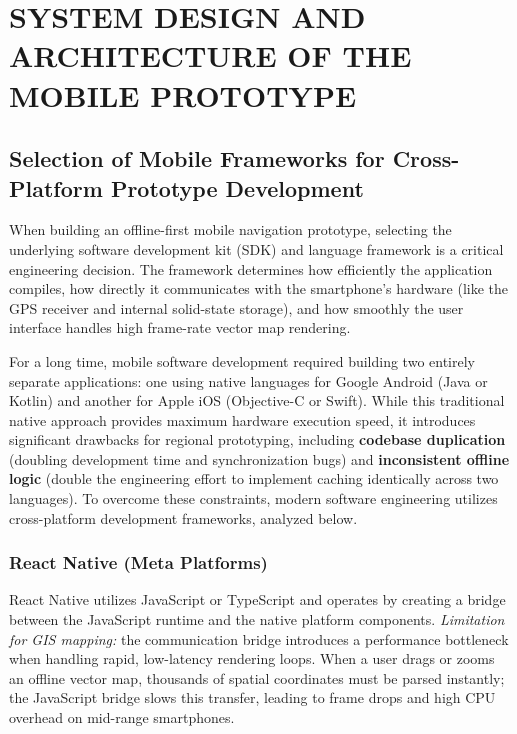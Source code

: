 \documentclass[12pt,a4paper,oneside]{report}
\begin{document}
\chapter{SYSTEM DESIGN AND ARCHITECTURE OF THE MOBILE PROTOTYPE}

\section{Selection of Mobile Frameworks for Cross-Platform Prototype Development}

When building an offline-first mobile navigation prototype, selecting the underlying
software development kit (SDK) and language framework is a critical engineering decision.
The framework determines how efficiently the application compiles, how directly it
communicates with the smartphone's hardware (like the GPS receiver and internal
solid-state storage), and how smoothly the user interface handles high frame-rate vector
map rendering.

For a long time, mobile software development required building two entirely separate
applications: one using native languages for Google Android (Java or Kotlin) and another
for Apple iOS (Objective-C or Swift). While this traditional native approach provides
maximum hardware execution speed, it introduces significant drawbacks for regional
prototyping, including \textbf{codebase duplication} (doubling development time and
synchronization bugs) and \textbf{inconsistent offline logic} (double the engineering
effort to implement caching identically across two languages). To overcome these
constraints, modern software engineering utilizes cross-platform development frameworks,
analyzed below.

\subsection{React Native (Meta Platforms)}

React Native utilizes JavaScript or TypeScript and operates by creating a bridge between
the JavaScript runtime and the native platform components. \emph{Limitation for GIS
mapping:} the communication bridge introduces a performance bottleneck when handling
rapid, low-latency rendering loops. When a user drags or zooms an offline vector map,
thousands of spatial coordinates must be parsed instantly; the JavaScript bridge slows
this transfer, leading to frame drops and high CPU overhead on mid-range smartphones.
\end{document}
